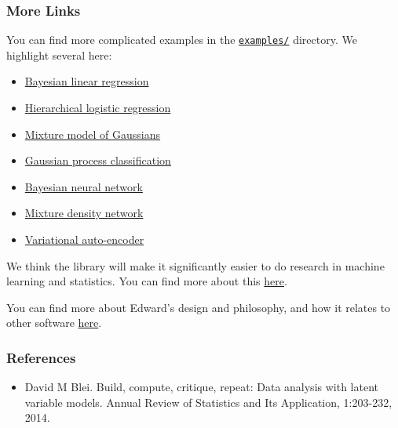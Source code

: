 \subsubsection{More Links}\label{more-links}

You can find more complicated examples in the
\href{https://github.com/blei-lab/edward/tree/master/examples}{\texttt{examples/}}
directory. We highlight several here:

\begin{itemize}
\tightlist
\item
  \href{https://github.com/blei-lab/edward/blob/master/examples/bayesian_linear_regression.py}{Bayesian
  linear regression}
\item
  \href{https://github.com/blei-lab/edward/blob/master/examples/hierarchical_logistic_regression.py}{Hierarchical
  logistic regression}
\item
  \href{https://github.com/blei-lab/edward/blob/master/examples/mixture_gaussian.py}{Mixture
  model of Gaussians}
\item
  \href{https://github.com/blei-lab/edward/blob/master/examples/gp_classification.py}{Gaussian
  process classification}
\item
  \href{https://github.com/blei-lab/edward/blob/master/examples/bayesian_nn.py}{Bayesian
  neural network}
\item
  \href{https://github.com/blei-lab/edward/blob/master/examples/mixture_density_network.py}{Mixture
  density network}
\item
  \href{https://github.com/blei-lab/edward/blob/master/examples/convolutional_vae.py}{Variational
  auto-encoder}
\end{itemize}

We think the library will make it significantly easier to do research in
machine learning and statistics. You can find more about this
\href{guide-research.md}{here}.

You can find more about Edward's design and philosophy, and how it
relates to other software \href{design.md}{here}.

\subsubsection{References}\label{references}

\begin{itemize}
\tightlist
\item
  David M Blei. Build, compute, critique, repeat: Data analysis with
  latent variable models. Annual Review of Statistics and Its
  Application, 1:203-232, 2014.
\end{itemize}
